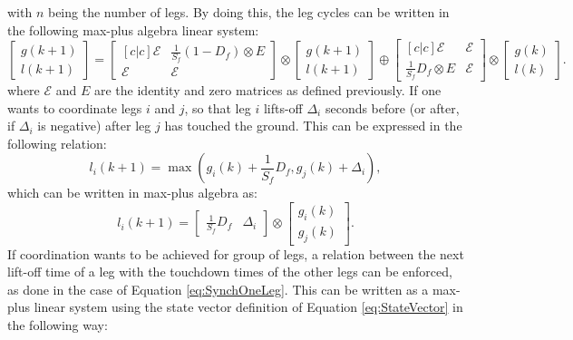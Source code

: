 \documentclass[main.tex]{subfiles}
\begin{document}
\vspace{0.3cm}
with $n$ being the number of legs. By doing this, the leg cycles can be written in the following max-plus algebra linear system:
\begin{equation}
\begin{bmatrix}
g(k + 1) \\
l(k + 1)
\end{bmatrix} =
\begin{bmatrix}[c|c]
\mathcal{E} & \frac{1}{S_f}(1 - D_f) \otimes E \\ \hline
\mathcal{E} & \mathcal{E}
\end{bmatrix} \otimes \begin{bmatrix}
g(k + 1) \\
l(k + 1)
\end{bmatrix} \oplus \begin{bmatrix}[c|c]
\mathcal{E} & \mathcal{E} \\ \hline
\frac{1}{S_f}D_f \otimes E & \mathcal{E}
\end{bmatrix} \otimes \begin{bmatrix}
g(k) \\
l(k)
\end{bmatrix}.
\end{equation}
where $\mathcal{E}$ and $E$ are the identity and zero matrices as defined previously. If one wants to coordinate legs $i$ and $j$, so that leg $i$ lifts-off $\Delta_i$ seconds before (or after, if $\Delta_i$ is negative) after leg $j$ has touched the ground. This can be expressed in the following relation:
\begin{equation}
l_i(k+1) = \max (g_i(k) + \frac{1}{S_f}D_f, g_j (k) + \Delta_i),
\end{equation} 
which can be written in max-plus algebra as:
\begin{equation}
l_i(k+1) = \begin{bmatrix}
\frac{1}{S_f}D_f & \Delta_i
\end{bmatrix} \otimes \begin{bmatrix}
g_i(k) \\
g_j(k)
\end{bmatrix}.\label{eq:SynchOneLeg}
\end{equation}
If coordination wants to be achieved for group of legs, a relation between the next lift-off time of a leg with the touchdown times of the other legs can be enforced, as done in the case of Equation \eqref{eq:SynchOneLeg}. This can be written as a max-plus linear system using the state vector definition of Equation \eqref{eq:StateVector} in the following way:
\end{document}
